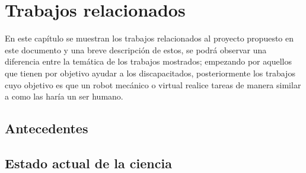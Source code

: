 
\chapter{Trabajos relacionados}
\label{sec:chapter2}

En este cap\'itulo se muestran los trabajos relacionados al proyecto propuesto
 en este documento y una breve descripci\'on de estos, se podr\'a observar una
 diferencia entre la tem\'atica de los trabajos mostrados; empezando 
 por aquellos que tienen por objetivo ayudar a los discapacitados, 
 posteriormente los trabajos cuyo objetivo es que un robot mec\'anico o virtual 
 realice tareas de manera similar a como las har\'ia un ser humano.
 

\section{Antecedentes}







\section{Estado actual de la ciencia}





\newpage







